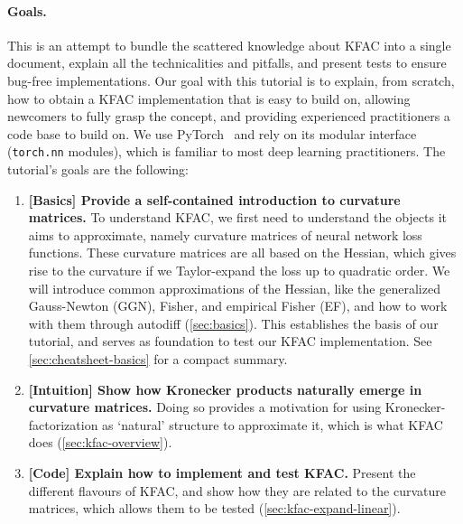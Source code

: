 \paragraph{Goals.}
This is an attempt to bundle the scattered knowledge about KFAC into a single document, explain all the technicalities and pitfalls, and present tests to ensure bug-free implementations.
Our goal with this tutorial is to explain, from scratch, how to obtain a KFAC implementation that is easy to build on, allowing newcomers to fully grasp the concept, and providing experienced practitioners a code base to build on.
We use PyTorch~\cite{paszke2019pytorch} and rely on its modular interface (\texttt{torch.nn} modules), which is familiar to most deep learning practitioners.
The tutorial's goals are the following:
\begin{enumerate}
\item \textbf{[Basics] Provide a self-contained introduction to curvature matrices.}
  To understand KFAC, we first need to understand the objects it aims to approximate, namely curvature matrices of neural network loss functions.
  These curvature matrices are all based on the Hessian, which gives rise to the curvature if we Taylor-expand the loss up to quadratic order.
  We will introduce common approximations of the Hessian, like the generalized Gauss-Newton (GGN), Fisher, and empirical Fisher (EF), and how to work with them through autodiff (\cref{sec:basics}).
  This establishes the basis of our tutorial, and serves as foundation to test our KFAC implementation.
  See \cref{sec:cheatsheet-basics} for a compact summary.

\item \textbf{[Intuition] Show how Kronecker products naturally emerge in curvature matrices.} Doing so provides a motivation for using Kronecker-factorization as `natural' structure to approximate it, which is what KFAC does (\cref{sec:kfac-overview}).

\item \textbf{[Code] Explain how to implement and test KFAC.} Present the different flavours of KFAC, and show how they are related to the curvature matrices, which allows them to be tested (\cref{sec:kfac-expand-linear}).
\end{enumerate}
